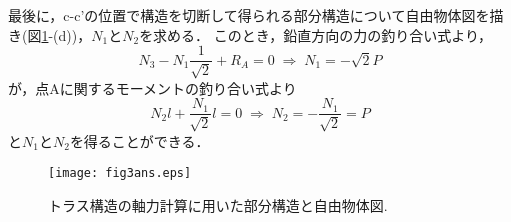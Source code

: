 \documentclass[10pt,a4j]{jarticle}
\begin{document}
最後に，c-c'の位置で構造を切断して得られる部分構造について自由物体図を描き(図\ref{fig:fig3}-(d))，$N_1$と$N_2$を求める．
このとき，鉛直方向の力の釣り合い式より，
\begin{equation}
	N_3-N_1\frac{1}{\sqrt{2}}+R_A=0 \; \Rightarrow \; N_1=-\sqrt{2}P
\end{equation}
が，点Aに関するモーメントの釣り合い式より
\begin{equation}
	N_2l+\frac{N_1}{\sqrt{2}}l =0 \; \Rightarrow \; N_2=-\frac{N_1}{\sqrt{2}}=P
\end{equation}
と$N_1$と$N_2$を得ることができる．
\begin{figure}[h]
	\begin{center}
	\texttt{[image: fig3ans.eps]} 
	\end{center}
	\caption{トラス構造の軸力計算に用いた部分構造と自由物体図.} 
	\label{fig:fig3}
\end{figure}
\end{document}

